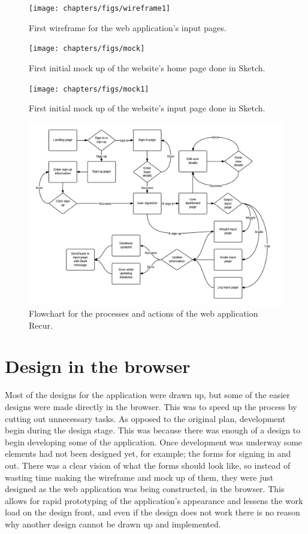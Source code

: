 \begin{figure}[!ht]
\centering
\texttt{[image: chapters/figs/wireframe1]}
\caption{First wireframe for the web application's input pages.}
\label{fig:erd}
\end{figure}

\begin{figure}[!ht]
\centering
\texttt{[image: chapters/figs/mock]}
\caption{First initial mock up of the website's home page done in Sketch.}
\label{fig:erd}
\end{figure}

\begin{figure}[!ht]
\centering
\texttt{[image: chapters/figs/mock1]}
\caption{First initial mock up of the website's input page done in Sketch.}
\label{fig:erd}
\end{figure}

\begin{figure}[!ht]
\centering
\includegraphics[scale=0.3]{chapters/figs/flowchart}
\caption{Flowchart for the processes and actions of the web application Recur.}
\label{fig:flowchart}
\end{figure}

\section{Design in the browser}
Most of the designs for the application were drawn up, but some of the easier designs were made directly in the browser. This was to speed up the process by cutting out unnecessary tasks. As opposed to the original plan, development begin during the design stage. This was because there was enough of a design to begin developing some of the application. Once development was underway some elements had not been designed yet, for example; the forms for signing in and out. There was a clear vision of what the forms should look like, so instead of wasting time making the wireframe and mock up of them, they were just designed as the web application was being constructed, in the browser. This allows for rapid prototyping of the application's appearance and lessens the work load on the design front, and even if the design does not work there is no reason why another design cannot be drawn up and implemented.\\

